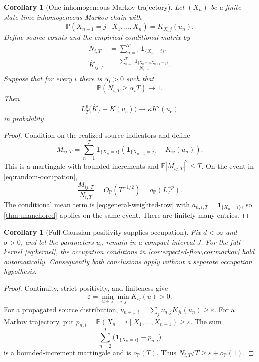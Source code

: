 \documentclass[11pt]{article}
\newtheorem{corollary}[theorem]{Corollary}
\theoremstyle{definition}
\theoremstyle{remark}
\newcommand{\E}{\mathbb E}
\newcommand{\uc}{u_{\mathrm c}}
\begin{document}
\begin{corollary}[One inhomogeneous Markov trajectory]
\label{cor:markov}
Let $(X_n)$ be a finite-state time-inhomogeneous Markov chain with
\[
  \mathbb P(X_{n+1}=j\mid X_1,\ldots,X_n)
  =K_{X_nj}(u_n).
\]
Define source counts and the empirical conditional matrix by
\begin{align}
  N_{i,T}&=\sum_{n=1}^T\mathbf1_{\{X_n=i\}},\\
  \widehat K_{ij,T}
  &=\frac{\sum_{n=1}^T
    \mathbf1_{\{X_n=i,X_{n+1}=j\}}}{N_{i,T}}.
\end{align}
Suppose that for every $i$ there is $\alpha_i>0$ such that
\begin{equation}\label{eq:random-occupation}
  \mathbb P(N_{i,T}\ge\alpha_iT)\longrightarrow1.
\end{equation}
Then
\begin{equation}\label{eq:markov-response}
  L_T^p\bigl(\widehat K_T-K(\uc)\bigr)
  \longrightarrow\kappa K'(\uc)
\end{equation}
in probability.
\end{corollary}

\begin{proof}
Condition on the realized source indicators and define
\[
  M_{ij,T}=\sum_{n=1}^T\mathbf1_{\{X_n=i\}}
  \left(\mathbf1_{\{X_{n+1}=j\}}-K_{ij}(u_n)\right).
\]
This is a martingale with bounded increments and
$\E|M_{ij,T}|^2\le T$.  On the event in \eqref{eq:random-occupation},
\[
  \frac{M_{ij,T}}{N_{i,T}}=O_{\mathbb P}(T^{-1/2})
  =o_{\mathbb P}(L_T^{-p}).
\]
The conditional mean term is \eqref{eq:general-weighted-row} with
$a_{n,i,T}=\mathbf1_{\{X_n=i\}}$, so \cref{thm:unanchored} applies on
the same event.  There are finitely many entries.
\end{proof}

\begin{corollary}[Full Gaussian positivity supplies occupation]
\label{cor:gaussian-occupation}
Fix $d<\infty$ and $\sigma>0$, and let the parameters $u_n$ remain in a
compact interval $J$.  For the full kernel \eqref{eq:kernel}, the occupation
conditions in \cref{cor:expected-flow,cor:markov} hold automatically.
Consequently both conclusions apply without a separate occupation
hypothesis.
\end{corollary}

\begin{proof}
Continuity, strict positivity, and finiteness give
\[
  \varepsilon=\min_{u\in J}\min_{i,j}K_{ij}(u)>0.
\]
For a propagated source distribution,
$\nu_{n+1,i}=\sum_j\nu_{n,j}K_{ji}(u_n)\ge\varepsilon$.
For a Markov trajectory, put
$p_{n,i}=\mathbb P(X_n=i\mid X_1,\ldots,X_{n-1})\ge\varepsilon$.
The sum
\[
  \sum_{n=2}^T\bigl(\mathbf1_{\{X_n=i\}}-p_{n,i}\bigr)
\]
is a bounded-increment martingale and is $o_{\mathbb P}(T)$.
Thus $N_{i,T}/T\ge\varepsilon+o_{\mathbb P}(1)$.
\end{proof}
\end{document}
